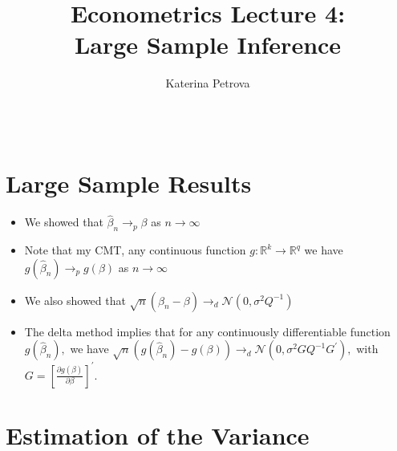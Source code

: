 \documentclass[notes=show]{beamer}
\begin{document}
\title{Econometrics Lecture 4: \\
Large Sample Inference}
\author{Katerina Petrova \ \ \ \ \ \ \ \ \ \ \ \ \ \ \ \ \ \ \ \ \ \ \ \ \ \
\ \ \ \ \ \ \ \ \ \ \ \ \ \ \ \ \ \ \ \ \ \ \ \ \ \ \ \ \ \ \ \ \ \ \ \ \ \
\ \ \ \ \ \ \ \ \ \ \ \ \ \ \ \ \ \ \ \ \ \ \ }
\date{}
\maketitle

\section{Large Sample Results}

\begin{frame}%

\begin{itemize}
\item We showed that $\widehat{\beta }_{n}\rightarrow _{p}\beta $ as $%
n\rightarrow \infty $

\item Note that my CMT, any continuous function $g:\mathbb{R}^{k}\rightarrow 
\mathbb{R}^{q}$ we have $g\left( \hat{\beta}_{n}\right) \rightarrow
_{p}g\left( \beta \right) $ as $n\rightarrow \infty $

\item We also showed that $\sqrt{n}\left( \widehat{\beta }_{n}-\beta \right)
\rightarrow _{d}\mathcal{N}\left( 0,\sigma ^{2}Q^{-1}\right) $

\item The delta method implies that for any continuously differentiable
function $g\left( \hat{\beta}_{n}\right) ,$ we have $\sqrt{n}\left( g\left( 
\widehat{\beta }_{n}\right) -g\left( \beta \right) \right) \rightarrow _{d}%
\mathcal{N}\left( 0,\sigma ^{2}GQ^{-1}G^{\prime }\right) ,$ with $G=\left[ 
\frac{\partial g\left( \beta \right) }{\partial \beta }\right] ^{\prime }.$
\end{itemize}

\end{frame}%

\section{Estimation of the Variance}
\end{document}
